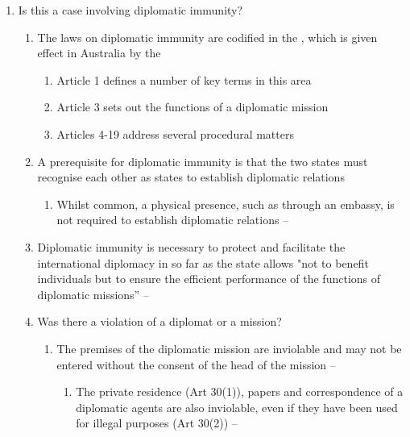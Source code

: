 \begin{enumerate}
    \item Is this a case involving diplomatic immunity?
    \begin{enumerate}
        \item The laws on diplomatic immunity are codified in the , which is given effect in Australia by the 
        \begin{enumerate}
            \item Article 1 defines a number of key terms in this area
            \item Article 3 sets out the functions of a diplomatic mission
            \item Articles 4-19 address several procedural matters
        \end{enumerate}
        \item A prerequisite for diplomatic immunity is that the two states must recognise each other as states to establish diplomatic relations
        \begin{enumerate}
            \item Whilst common, a physical presence, such as through an embassy, is not required to establish diplomatic relations -- 
        \end{enumerate}
        \item Diplomatic immunity is necessary to protect and facilitate the international diplomacy in so far as the state allows "not to benefit individuals but to ensure the efficient performance of the functions of diplomatic missions'' -- 
        \item Was there a violation of a diplomat or a mission?
        \begin{enumerate}
            \item The premises of the diplomatic mission are inviolable and may not be entered without the consent of the head of the mission -- 
            \begin{enumerate}
                \item The private residence (Art 30(1)), papers and correspondence of a diplomatic agents are also inviolable, even if they have been used for illegal purposes (Art 30(2)) -- 

\end{enumerate}
\end{enumerate}
\end{enumerate}
\end{enumerate}
